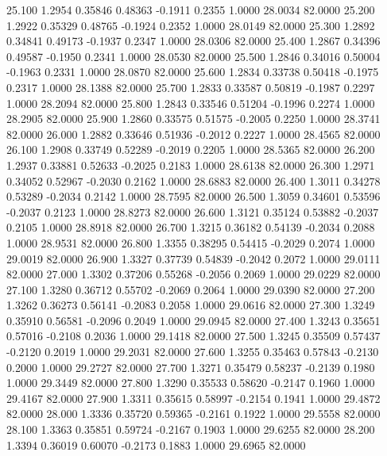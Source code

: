   25.100   1.2954   0.35846   0.48363  -0.1911   0.2355   1.0000  28.0034  82.0000
  25.200   1.2922   0.35329   0.48765  -0.1924   0.2352   1.0000  28.0149  82.0000
  25.300   1.2892   0.34841   0.49173  -0.1937   0.2347   1.0000  28.0306  82.0000
  25.400   1.2867   0.34396   0.49587  -0.1950   0.2341   1.0000  28.0530  82.0000
  25.500   1.2846   0.34016   0.50004  -0.1963   0.2331   1.0000  28.0870  82.0000
  25.600   1.2834   0.33738   0.50418  -0.1975   0.2317   1.0000  28.1388  82.0000
  25.700   1.2833   0.33587   0.50819  -0.1987   0.2297   1.0000  28.2094  82.0000
  25.800   1.2843   0.33546   0.51204  -0.1996   0.2274   1.0000  28.2905  82.0000
  25.900   1.2860   0.33575   0.51575  -0.2005   0.2250   1.0000  28.3741  82.0000
  26.000   1.2882   0.33646   0.51936  -0.2012   0.2227   1.0000  28.4565  82.0000
  26.100   1.2908   0.33749   0.52289  -0.2019   0.2205   1.0000  28.5365  82.0000
  26.200   1.2937   0.33881   0.52633  -0.2025   0.2183   1.0000  28.6138  82.0000
  26.300   1.2971   0.34052   0.52967  -0.2030   0.2162   1.0000  28.6883  82.0000
  26.400   1.3011   0.34278   0.53289  -0.2034   0.2142   1.0000  28.7595  82.0000
  26.500   1.3059   0.34601   0.53596  -0.2037   0.2123   1.0000  28.8273  82.0000
  26.600   1.3121   0.35124   0.53882  -0.2037   0.2105   1.0000  28.8918  82.0000
  26.700   1.3215   0.36182   0.54139  -0.2034   0.2088   1.0000  28.9531  82.0000
  26.800   1.3355   0.38295   0.54415  -0.2029   0.2074   1.0000  29.0019  82.0000
  26.900   1.3327   0.37739   0.54839  -0.2042   0.2072   1.0000  29.0111  82.0000
  27.000   1.3302   0.37206   0.55268  -0.2056   0.2069   1.0000  29.0229  82.0000
  27.100   1.3280   0.36712   0.55702  -0.2069   0.2064   1.0000  29.0390  82.0000
  27.200   1.3262   0.36273   0.56141  -0.2083   0.2058   1.0000  29.0616  82.0000
  27.300   1.3249   0.35910   0.56581  -0.2096   0.2049   1.0000  29.0945  82.0000
  27.400   1.3243   0.35651   0.57016  -0.2108   0.2036   1.0000  29.1418  82.0000
  27.500   1.3245   0.35509   0.57437  -0.2120   0.2019   1.0000  29.2031  82.0000
  27.600   1.3255   0.35463   0.57843  -0.2130   0.2000   1.0000  29.2727  82.0000
  27.700   1.3271   0.35479   0.58237  -0.2139   0.1980   1.0000  29.3449  82.0000
  27.800   1.3290   0.35533   0.58620  -0.2147   0.1960   1.0000  29.4167  82.0000
  27.900   1.3311   0.35615   0.58997  -0.2154   0.1941   1.0000  29.4872  82.0000
  28.000   1.3336   0.35720   0.59365  -0.2161   0.1922   1.0000  29.5558  82.0000
  28.100   1.3363   0.35851   0.59724  -0.2167   0.1903   1.0000  29.6255  82.0000
  28.200   1.3394   0.36019   0.60070  -0.2173   0.1883   1.0000  29.6965  82.0000
